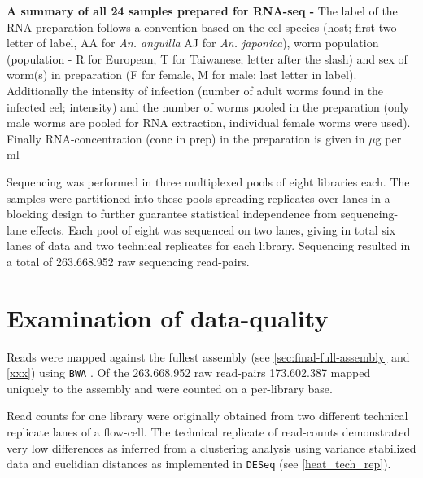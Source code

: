 \begin{table}[h]
\begin{center}
\caption[Summary of RNA preparation]{\textbf{A summary of all 24
    samples prepared for RNA-seq -} The label of the RNA preparation
  follows a convention based on the eel species (host; first two
  letter of label, AA for \textit{An. anguilla} AJ for
  \textit{An. japonica}), worm population (population - R for
  European, T for Taiwanese; letter after the slash) and sex of
  worm(s) in preparation (F for female, M for male; last letter in
  label). Additionally the intensity of infection (number of adult
  worms found in the infected eel; intensity) and the number of worms
  pooled in the preparation (only male worms are pooled for RNA
  extraction, individual female worms were used). Finally
  RNA-concentration (conc in prep) in the preparation is given in
  $\mu$g per ml}
\label{tab:lib-prep}
\end{center}
\end{table}

Sequencing was performed in three multiplexed pools of eight libraries
each. The samples were partitioned into these pools spreading
replicates over lanes in a blocking design to further guarantee
statistical independence from sequencing-lane effects. Each pool of
eight was sequenced on two lanes, giving in total six lanes of data
and two technical replicates for each library. Sequencing resulted in
a total of 263.668.952 raw sequencing read-pairs.

\section{Examination of data-quality}

Reads were mapped against the fullest assembly (see
\ref{sec:final-full-assembly} and \ref{xxx}) using \texttt{BWA}
\cite{pmid20080505}. Of the 263.668.952 raw read-pairs 173.602.387
mapped uniquely to the assembly and were counted on a per-library
base.

Read counts for one library were originally obtained from two
different technical replicate lanes of a flow-cell. The technical
replicate of read-counts demonstrated very low differences as inferred
from a clustering analysis using variance stabilized data and
euclidian distances as implemented in \texttt{DESeq}
\cite{pmid20979621} (see \ref{heat_tech_rep}).


